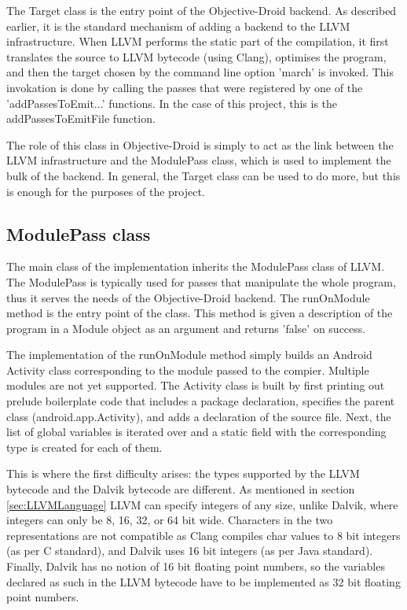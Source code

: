 \documentclass[parskip]{cs4rep}
\begin{document}
The Target class is the entry point of the Objective-Droid backend. As described earlier, it is the standard mechanism of adding a backend to the LLVM infrastructure. When LLVM performs the static part of the compilation, it first translates the source to LLVM bytecode (using Clang), optimises the program, and then the target chosen by the command line option 'march' is invoked. This invokation is done by calling the passes that were registered by one of the 'addPassesToEmit...' functions. In the case of this project, this is the addPassesToEmitFile function.

The role of this class in Objective-Droid is simply to act as the link between the LLVM infrastructure and the ModulePass class, which is used to implement the bulk of the backend. In general, the Target class can be used to do more, but this is enough for the purposes of the project.

\subsection{ModulePass class} \label{sec:ModulePassClass}

The main class of the implementation inherits the ModulePass class of LLVM. The ModulePass is typically used for passes that manipulate the whole program, thus it serves the needs of the Objective-Droid backend. The runOnModule method is the entry point of the class. This method is given a description of the program in a Module object as an argument and returns 'false' on success.

The implementation of the runOnModule method simply builds an Android Activity class corresponding to the module passed to the compier. Multiple modules are not yet supported. The Activity class is built by first printing out prelude boilerplate code that includes a package declaration, specifies the parent class (android.app.Activity), and adds a declaration of the source file. Next, the list of global variables is iterated over and a static field with the corresponding type is created for each of them. 

This is where the first difficulty arises: the types supported by the LLVM bytecode and the Dalvik bytecode are different. As mentioned in section \ref{sec:LLVMLanguage} LLVM can specify integers of any size, unlike Dalvik, where integers can only be 8, 16, 32, or 64 bit wide. Characters in the two representations are not compatible as Clang compiles char values to 8 bit integers (as per C standard), and Dalvik uses 16 bit integers (as per Java standard). Finally, Dalvik has no notion of 16 bit floating point numbers, so the variables declared as such in the LLVM bytecode have to be implemented as 32 bit floating point numbers.
\end{document}
